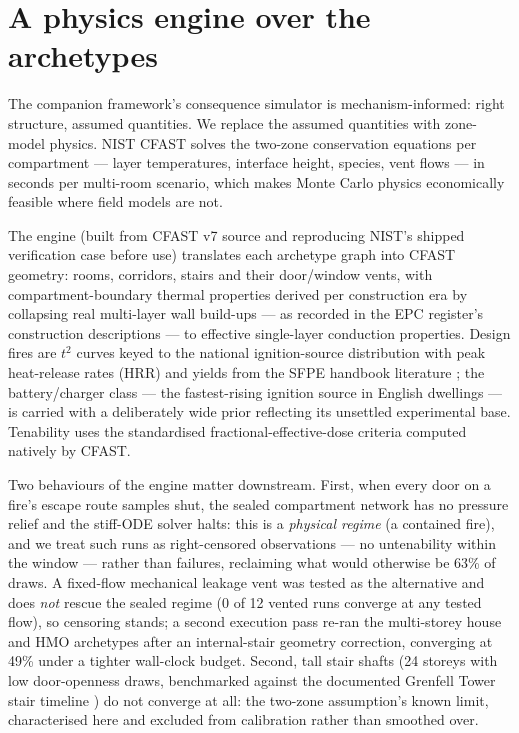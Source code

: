 \documentclass[11pt]{article}
\begin{document}
\section{A physics engine over the archetypes}
\label{sec:engine}

The companion framework's consequence simulator is mechanism-informed: right
structure, assumed quantities. We replace the assumed quantities with zone-model
physics. NIST CFAST \citep{cfast2021,cfastvv2021} solves the two-zone conservation
equations per compartment --- layer temperatures, interface height, species,
vent flows --- in seconds per multi-room scenario, which makes Monte Carlo
physics economically feasible where field models are not.

The engine (built from CFAST v7 source and reproducing NIST's shipped
verification case before use) translates each archetype graph into CFAST
geometry: rooms, corridors, stairs and their door/window vents, with
compartment-boundary thermal properties derived per construction era by
collapsing real multi-layer wall build-ups --- as recorded in the EPC
register's construction descriptions --- to effective single-layer conduction
properties. Design fires are $t^2$ curves keyed to the national
ignition-source distribution with peak heat-release rates (HRR) and yields from the
SFPE handbook literature \citep{tewarson2016}; the battery/charger class ---
the fastest-rising ignition source in English dwellings --- is carried with a
deliberately wide prior reflecting its unsettled experimental base. Tenability
uses the standardised fractional-effective-dose criteria \citep{iso13571}
computed natively by CFAST.

Two behaviours of the engine matter downstream. First, when every door on a
fire's escape route samples shut, the sealed compartment network has no
pressure relief and the stiff-ODE solver halts: this is a \emph{physical
regime} (a contained fire), and we treat such runs as right-censored
observations --- no untenability within the window --- rather than failures,
reclaiming what would otherwise be 63\% of draws. A fixed-flow mechanical
leakage vent was tested as the alternative and does \emph{not} rescue the
sealed regime (0 of 12 vented runs converge at any tested flow), so censoring
stands; a second execution pass re-ran the multi-storey house and HMO
archetypes after an internal-stair geometry correction, converging at 49\%
under a tighter wall-clock budget. Second, tall stair shafts (24 storeys with low door-openness draws,
benchmarked against the documented Grenfell Tower stair timeline
\citep{grenfell2019phase1}) do not converge at all: the two-zone
assumption's known limit, characterised here and excluded from calibration
rather than smoothed over.
\end{document}
